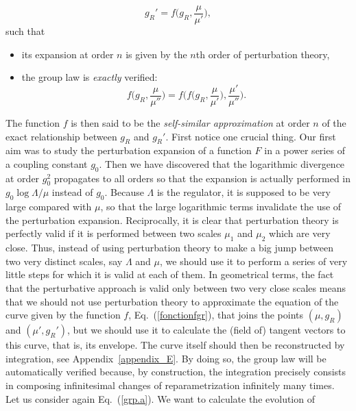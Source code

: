 \documentclass[floatfix,twocolumn,preprintnumbers,amsmath,amssymb,prb]{revtex4}
\begin{document}
\begin{equation}
g_R'= f\big(g_R,\frac{\mu}{\mu'}\big),
\label{fonctionfgr}
\end{equation}
such that 
\begin{itemize}

\item its expansion at order $n$ is given by the $n$th order of
perturbation theory, 

\item the group law is {\it exactly} verified:
\begin{equation}
f\big(g_R,\frac{\mu}{\mu''}\big)=
f\big(f\big(g_R,\frac{\mu}{\mu'}\big),\frac{\mu'}{\mu''}\big).
\label{grouplaw}
\end{equation}
\end{itemize}
The function $f$ is then said to be the {\em self-similar
approximation} at order $n$ of the exact relationship between
$g_R$ and $g_R'$.\cite{kovalev99} First notice one crucial thing.
Our first aim was to study the perturbation expansion of a
function $F$ in a power series of a coupling constant $g_0$. Then
we have discovered that the logarithmic divergence at order
$g_0^2$ propagates to all orders so that the expansion is actually
performed in $g_0 \log\Lambda/\mu$ instead of $g_0$. Because
$\Lambda$ is the regulator, it is supposed to be very large
compared with $\mu$, so that the large logarithmic terms
invalidate the use of the perturbation expansion. Reciprocally, it
is clear that perturbation theory is perfectly valid if it is
performed between two scales $\mu_1$ and $\mu_2$ which are very
close. Thus, instead of using perturbation theory to make a big
jump between two very distinct scales, say $\Lambda$ and $\mu$, we
should use it to perform a series of very little steps for which
it is valid at each of them. In geometrical terms, the fact that
the perturbative approach is valid only between two very close scales
 means that we should not use perturbation theory to
approximate the equation of the curve given by the function $f$,
Eq.~(\ref{fonctionfgr}), that joins the points $(\mu,g_R)$ and
$(\mu',g_R')$, but we should use it to calculate the (field of)
tangent vectors to this curve, that is, its envelope. The curve
itself should then be reconstructed by integration, see
Appendix~\ref{appendix_E}. By doing so, the group law will be
automatically verified because, by construction, the integration
precisely consists in composing infinitesimal changes of
reparametrization infinitely many times. Let us consider again
Eq.~(\ref{grp.a}). We want to calculate the evolution of 
\end{document}
